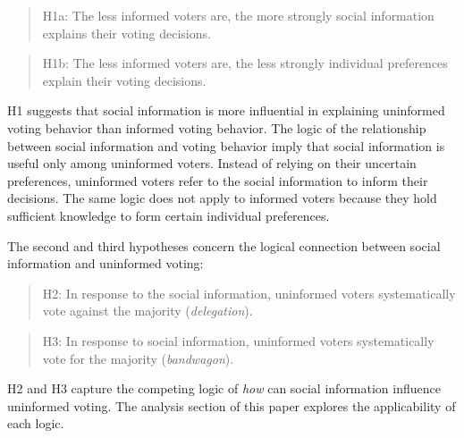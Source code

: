 \documentclass[doc,natbib,12pt]{apa6}\usepackage[]{graphicx}\usepackage[]{color}
\begin{document}
    \begin{verse}
        H1a: The less informed voters are, the more strongly social information explains their voting decisions. 
    \end{verse}
    \begin{verse}
        H1b: The less informed voters are, the less strongly individual preferences explain their voting decisions. 
    \end{verse}
    
    \noindent H1 suggests that social information is more influential in explaining uninformed voting behavior than informed voting behavior. The logic of the relationship between social information and voting behavior imply that social information is useful only among uninformed voters. Instead of relying on their uncertain preferences, uninformed voters refer to the social information to inform their decisions. The same logic does not apply to informed voters because they hold sufficient knowledge to form certain individual preferences.
    
    \par The second and third hypotheses concern the logical connection between social information and uninformed voting:
    
    \begin{verse}
        H2: In response to the social information, uninformed voters systematically vote against the majority (\textit{delegation}). 
    \end{verse}
    
    \begin{verse}
        H3: In response to social information, uninformed voters systematically vote for the majority (\textit{bandwagon}).
    \end{verse}
    
    \par H2 and H3 capture the competing logic of \textit{how} can social information influence uninformed voting. The analysis section of this paper explores the applicability of each logic. %
    
    
\end{document}
